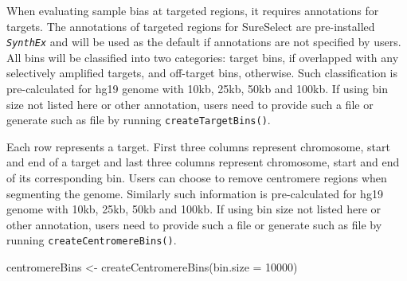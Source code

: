 \documentclass{article}
\newcommand{\pkg}[1]{\texttt{\textsl{#1}}}
\newcommand{\code}[1]{\texttt{#1}}
\begin{document}
When evaluating sample bias at targeted regions, it requires annotations for targets. The annotations of targeted regions for SureSelect are pre-installed \pkg{SynthEx} and will be used as the default if annotations are not specified by users. All bins will be classified into two categories: target bins, if overlapped with any selectively amplified targets, and off-target bins, otherwise. Such classification is pre-calculated for hg19 genome with 10kb, 25kb, 50kb and 100kb. If using bin size not listed here or other annotation, users need to provide such a file or generate such as file by running \code{createTargetBins()}.
\begin{Schunk}
\end{Schunk}

Each row represents a target. First three columns represent chromosome, start and end of a target and last three columns represent chromosome, start and end of its corresponding bin.
Users can choose to remove centromere regions when segmenting the genome. Similarly such information is pre-calculated for hg19 genome with 10kb, 25kb, 50kb and 100kb. If using bin size not listed here or other annotation, users need to provide such a file or generate such as file by running \code{createCentromereBins()}.

\begin{Schunk}
\begin{Sinput}
 centromereBins <- createCentromereBins(bin.size = 10000)
\end{Sinput}
\end{Schunk}
\end{document}
